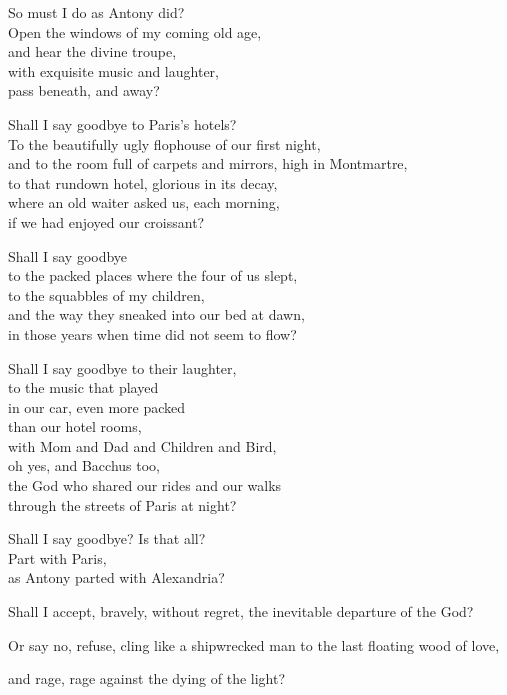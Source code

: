 \documentclass[12pt,twoside]{article}
\begin{document}
\begin{poem}
\begin{stanza}
So must I do as Antony did?\\
Open the windows of my coming old age,\\
and hear the divine troupe,\\
with exquisite music and laughter,\\
pass beneath, and away?
\end{stanza}
\begin{stanza}
Shall I say goodbye to Paris's hotels?\\
To the beautifully ugly flophouse of our first night,\\
and to the room full of carpets and mirrors, high in Montmartre,\\
to that rundown hotel, glorious in its decay,\\
where an old waiter asked us, each morning,\\
if we had enjoyed our croissant?
\end{stanza}
\begin{stanza}
Shall I say goodbye\\
to the packed places where the four of us slept,\\
to the squabbles of my children,\\
and the way they sneaked into our bed at dawn,\\
in those years when time did not seem to flow?
\end{stanza}
\begin{stanza}
Shall I say goodbye to their laughter,\\
to the music that played\\
in our car, even more packed\\
than our hotel rooms,\\
with Mom and Dad and Children and Bird,\\
oh yes, and Bacchus too,\\
the God who shared our rides and our walks\\
through the streets of Paris at night?
\end{stanza}
\begin{stanza}
Shall I say goodbye? Is that all?\\
Part with Paris,\\
as Antony parted with Alexandria?
\end{stanza}
\begin{stanza}
Shall I accept, bravely, without regret, the inevitable departure of the God?
\end{stanza}
\begin{stanza}
Or say no, refuse, cling like a shipwrecked man to the last floating wood of love,
\end{stanza}
\begin{stanza}
and rage, rage against the dying of the light?
\end{stanza}
\end{poem}
\end{document}
